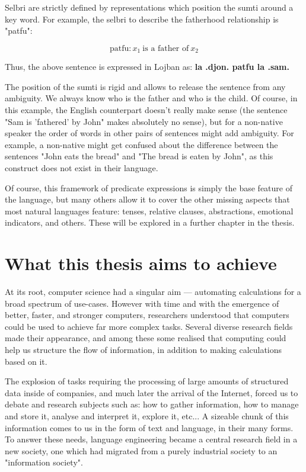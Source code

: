 Selbri are strictly defined by representations which position the sumti around a key word. For example, the selbri to describe the fatherhood relationship is "patfu":

$$\text{patfu}: x_1 \: \text{is a father of} \: x_2$$

Thus, the above sentence is expressed in Lojban as: \textbf{la .djon. patfu la .sam.} \newline

The position of the sumti is rigid and allows to release the sentence from any ambiguity. We always know who is the father and who is the child. Of course, in this example,
the English counterpart doesn't really make sense (the sentence "Sam is 'fathered' by John" makes absolutely no sense), but for a non-native speaker the order of words in
other pairs of sentences might add ambiguity. For example, a non-native might get confused about the difference between the sentences "John eats the bread" and "The bread is
eaten by John", as this construct does not exist in their language.\newline

Of course, this framework of predicate expressions is simply the base feature of the language, but many others allow it to cover the other missing aspects that most natural
languages feature: tenses, relative clauses, abstractions, emotional indicators, and others. These will be explored in a further chapter in the thesis. \newline

\section{What this thesis aims to achieve}

At its root, computer science had a singular aim --- automating calculations for a broad spectrum of use-cases. However with time and with the emergence of better, faster, and
stronger computers, researchers understood that computers could be used to achieve far more complex tasks. Several diverse research fields made their appearance, and among these
some realised that computing could help us structure the flow of information, in addition to making calculations based on it. \newline

The explosion of tasks requiring the processing of large amounts of structured data inside of companies, and much later the arrival of the Internet, forced us to debate and
research subjects such as: how to gather information, how to manage and store it, analyse and interpret it, explore it, etc... A sizeable chunk of this information comes to us
in the form of text and language, in their many forms. To answer these needs, language engineering became a central research field in a new society, one which had migrated
from a purely industrial society to an "information society".\newline

